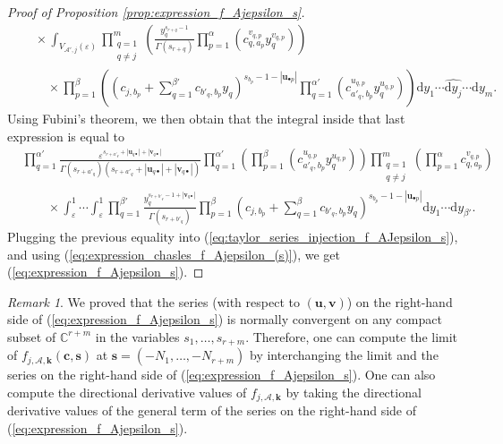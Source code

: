 \documentclass[a4paper]{amsart}
\theoremstyle{remark}
\newtheorem{remark}[theorem]{Remark}
\theoremstyle{definition}
\newcommand{\dd}{\mathrm{d}}
\begin{document}
\begin{proof}[Proof of Proposition \ref{prop:expression_f_Ajepsilon_s}]
\begin{align}
    & \quad \times \int_{V_{\mathcal{A}',j}(\varepsilon)} \prod_{\substack{q=1 \\ q \neq j}}^{m} \left( \frac{y_q^{s_{r+q}-1}}{\Gamma(s_{r+q})} \prod_{p=1}^{\alpha} \left( c_{q,a_p}^{v_{q,p}} y_{q}^{v_{q,p}} \right) \right) \nonumber \\
    & \qquad \times \prod_{p=1}^{\beta} \left( \left( c_{j,b_p}+\sum_{q=1}^{\beta'} c_{b'_q,b_p} y_{q} \right)^{s_{b_p}-1-|\mathbf{u}_{\bullet p}|} \prod_{q=1}^{\alpha'} \left( c_{a'_q,b_p}^{u_{q,p}} y_{q}^{u_{q,p}} \right) \right) \dd y_1 \cdots \widehat{\dd y_{j}}\cdots \dd y_{m}. \nonumber
\end{align}
Using Fubini's theorem, we then obtain that the integral inside that last expression is equal to
\begin{align*}
    &\prod_{q=1}^{\alpha'} \frac{\varepsilon^{s_{r+a'_q}+|\mathbf{u}_{q \bullet}|+|\mathbf{v}_{q \bullet}|}}{\Gamma(s_{r+a'_q})(s_{r+a'_q} +|\mathbf{u}_{q \bullet}|+|\mathbf{v}_{q \bullet}|)} \prod_{q=1}^{\alpha'} \left(\prod_{p=1}^{\beta} \left( c_{a'_q,b_p}^{u_{q,p}} y_{q}^{u_{q,p}} \right) \right) \prod_{\substack{q=1 \\ q \neq j}}^{m} \left( \prod_{p=1}^{\alpha} c_{q,a_p}^{v_{q,p}} \right)  \\
    & \qquad \times \int_{\varepsilon}^1 \cdots \int_{\varepsilon}^1 \prod_{q=1}^{\beta'} \frac{y_q^{s_{r+b'_q}-1 + |\mathbf{v}_{q \bullet}|}}{\Gamma(s_{r+b'_q})} \prod_{p=1}^{\beta}  \left( c_{j,b_p}+\sum_{q=1}^{\beta} c_{b'_q,b_p} y_{q} \right)^{s_{b_p}-1-|\mathbf{u}_{\bullet p}|} \dd y_1 \cdots \dd y_{\beta'}.
\end{align*}
Plugging the previous equality into (\ref{eq:taylor_series_injection_f_AJepsilon_s}), and using (\ref{eq:expression_chasles_f_Ajepsilon_(s)}), we get (\ref{eq:expression_f_Ajepsilon_s}).
\end{proof}

\begin{remark}
We proved that the series (with respect to $(\mathbf{u},\mathbf{v})$) on the right-hand side of (\ref{eq:expression_f_Ajepsilon_s}) is normally convergent on any compact subset of $\mathbb{C}^{r+m}$ in the variables $s_1,\ldots,s_{r+m}$. Therefore, one can compute the limit of $f_{j,\mathcal{A},\mathbf{k}}(\mathbf{c},\mathbf{s})$ at $\mathbf{s}=(-N_1,\ldots,-N_{r+m})$ by interchanging the limit and the series on the right-hand side of (\ref{eq:expression_f_Ajepsilon_s}). One can also compute the directional derivative values of $f_{j,\mathcal{A},\mathbf{k}}$ by taking the directional derivative values of the general term of the series on the right-hand side of (\ref{eq:expression_f_Ajepsilon_s}).
\end{remark}
\end{document}
